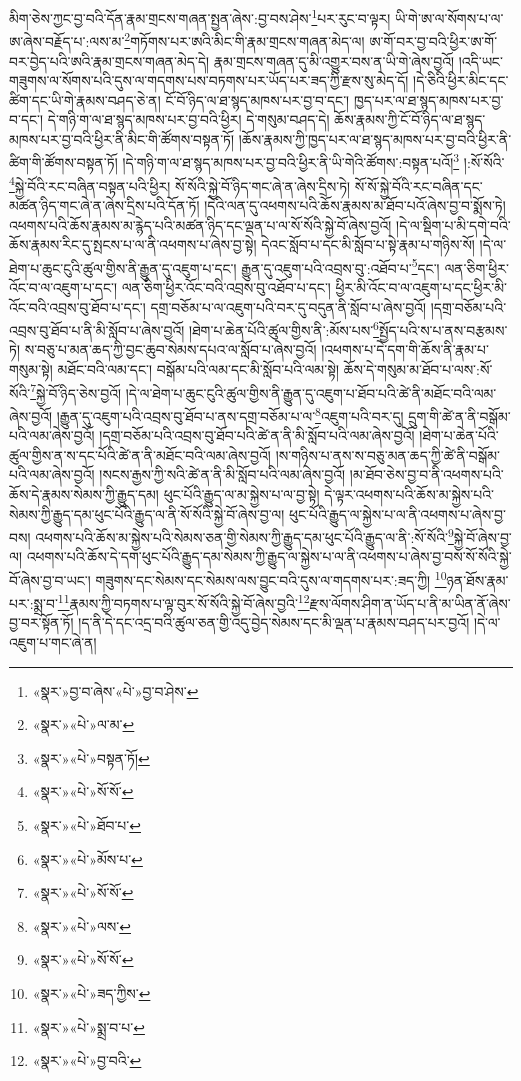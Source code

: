 མིག་ཅེས་ཀྱང་བྱ་བའི་དོན་རྣམ་གྲངས་གཞན་སྤྱན་ཞེས་:བྱ་བས་ཤེས་\footnote{«སྣར་»བྱ་བ་ཞེས་«པེ་»བྱ་བ་ཤེས་}པར་རུང་བ་ལྟར། ཡི་གེ་ཨ་ལ་སོགས་པ་ལ་ཨ་ཞེས་བརྗོད་པ་:ལས་མ་\footnote{«སྣར་»«པེ་»ལ་མ་}གཏོགས་པར་ཨའི་མིང་གི་རྣམ་གྲངས་གཞན་མེད་ལ། ཨ་གོ་བར་བྱ་བའི་ཕྱིར་ཨ་གོ་བར་བྱེད་པའི་ཨའི་རྣམ་གྲངས་གཞན་མེད་དེ། རྣམ་གྲངས་གཞན་དུ་མི་འགྱུར་བས་ན་ཡི་གེ་ཞེས་བྱའོ། །འདི་ཡང་གཟུགས་ལ་སོགས་པའི་དུས་ལ་གདགས་པས་བཏགས་པར་ཡོད་པར་ཟད་ཀྱི་རྫས་སུ་མེད་དོ། །དེ་ཅིའི་ཕྱིར་མིང་དང་ཚིག་དང་ཡི་གེ་རྣམས་བཤད་ཅེ་ན། ངོ་བོ་ཉིད་ལ་ཐ་སྙད་མཁས་པར་བྱ་བ་དང་། ཁྱད་པར་ལ་ཐ་སྙད་མཁས་པར་བྱ་བ་དང་། དེ་གཉི་ག་ལ་ཐ་སྙད་མཁས་པར་བྱ་བའི་ཕྱིར། དེ་གསུམ་བཤད་དེ། ཆོས་རྣམས་ཀྱི་ངོ་བོ་ཉིད་ལ་ཐ་སྙད་མཁས་པར་བྱ་བའི་ཕྱིར་ནི་མིང་གི་ཚོགས་བསྟན་ཏོ། །ཆོས་རྣམས་ཀྱི་ཁྱད་པར་ལ་ཐ་སྙད་མཁས་པར་བྱ་བའི་ཕྱིར་ནི་ཚིག་གི་ཚོགས་བསྟན་ཏོ། །དེ་གཉི་ག་ལ་ཐ་སྙད་མཁས་པར་བྱ་བའི་ཕྱིར་ནི་ཡི་གེའི་ཚོགས་:བསྟན་པའོ།\footnote{«སྣར་»«པེ་»བསྟན་ཏོ།} །:སོ་སོའི་\footnote{«སྣར་»«པེ་»སོ་སོ་}སྐྱེ་བོའི་རང་བཞིན་བསྟན་པའི་ཕྱིར། སོ་སོའི་སྐྱེ་བོ་ཉིད་གང་ཞེ་ན་ཞེས་དྲིས་ཏེ། སོ་སོ་སྐྱེ་བོའི་རང་བཞིན་དང་མཚན་ཉིད་གང་ཞེ་ན་ཞེས་དྲིས་པའི་དོན་ཏོ། །དེའི་ལན་དུ་འཕགས་པའི་ཆོས་རྣམས་མ་ཐོབ་པའོ་ཞེས་བྱ་བ་སྨོས་ཏེ། འཕགས་པའི་ཆོས་རྣམས་མ་རྙེད་པའི་མཚན་ཉིད་དང་ལྡན་པ་ལ་སོ་སོའི་སྐྱེ་བོ་ཞེས་བྱའོ། །དེ་ལ་སྡིག་པ་མི་དགེ་བའི་ཆོས་རྣམས་རིང་དུ་སྤངས་པ་ལ་ནི་འཕགས་པ་ཞེས་བྱ་སྟེ། དེའང་སློབ་པ་དང་མི་སློབ་པ་སྟེ་རྣམ་པ་གཉིས་སོ། །དེ་ལ་ཐེག་པ་ཆུང་ངུའི་ཚུལ་གྱིས་ནི་རྒྱུན་དུ་འཇུག་པ་དང་། རྒྱུན་དུ་འཇུག་པའི་འབྲས་བུ་:འཐོབ་པ་\footnote{«སྣར་»«པེ་»ཐོབ་པ་}དང་། ལན་ཅིག་ཕྱིར་འོང་བ་ལ་འཇུག་པ་དང་། ལན་ཅིག་ཕྱིར་འོང་བའི་འབྲས་བུ་འཐོབ་པ་དང་། ཕྱིར་མི་འོང་བ་ལ་འཇུག་པ་དང་ཕྱིར་མི་འོང་བའི་འབྲས་བུ་ཐོབ་པ་དང་། དགྲ་བཅོམ་པ་ལ་འཇུག་པའི་བར་དུ་བདུན་ནི་སློབ་པ་ཞེས་བྱའོ། །དགྲ་བཅོམ་པའི་འབྲས་བུ་ཐོབ་པ་ནི་མི་སློབ་པ་ཞེས་བྱའོ། །ཐེག་པ་ཆེན་པོའི་ཚུལ་གྱིས་ནི་:མོས་པས་\footnote{«སྣར་»«པེ་»མོས་པ་}སྤྱོད་པའི་ས་པ་ནས་བརྩམས་ཏེ། ས་བཅུ་པ་མན་ཆད་ཀྱི་བྱང་ཆུབ་སེམས་དཔའ་ལ་སློབ་པ་ཞེས་བྱའོ། །འཕགས་པ་དེ་དག་གི་ཆོས་ནི་རྣམ་པ་གསུམ་སྟེ། མཐོང་བའི་ལམ་དང་། བསྒོམ་པའི་ལམ་དང་མི་སློབ་པའི་ལམ་སྟེ། ཆོས་དེ་གསུམ་མ་ཐོབ་པ་ལས་:སོ་སོའི་\footnote{«སྣར་»«པེ་»སོ་སོ་}སྐྱེ་བོ་ཉིད་ཅེས་བྱའོ། །དེ་ལ་ཐེག་པ་ཆུང་ངུའི་ཚུལ་གྱིས་ནི་རྒྱུན་དུ་འཇུག་པ་ཐོབ་པའི་ཚེ་ནི་མཐོང་བའི་ལམ་ཞེས་བྱའོ། །རྒྱུན་དུ་འཇུག་པའི་འབྲས་བུ་ཐོབ་པ་ནས་དགྲ་བཅོམ་པ་ལ་\footnote{«སྣར་»«པེ་»ལས་}འཇུག་པའི་བར་དུ། དྲུག་གི་ཚེ་ན་ནི་བསྒོམ་པའི་ལམ་ཞེས་བྱའོ། །དགྲ་བཅོམ་པའི་འབྲས་བུ་ཐོབ་པའི་ཚེ་ན་ནི་མི་སློབ་པའི་ལམ་ཞེས་བྱའོ། །ཐེག་པ་ཆེན་པོའི་ཚུལ་གྱིས་ན་ས་དང་པོའི་ཚེ་ན་ནི་མཐོང་བའི་ལམ་ཞེས་བྱའོ། །ས་གཉིས་པ་ནས་ས་བཅུ་མན་ཆད་ཀྱི་ཚེ་ནི་བསྒོམ་པའི་ལམ་ཞེས་བྱའོ། །སངས་རྒྱས་ཀྱི་སའི་ཚེ་ན་ནི་མི་སློབ་པའི་ལམ་ཞེས་བྱའོ། །མ་ཐོབ་ཅེས་བྱ་བ་ནི་འཕགས་པའི་ཆོས་དེ་རྣམས་སེམས་ཀྱི་རྒྱུད་དམ། ཕུང་པོའི་རྒྱུད་ལ་མ་སྐྱེས་པ་ལ་བྱ་སྟེ། དེ་ལྟར་འཕགས་པའི་ཆོས་མ་སྐྱེས་པའི་སེམས་ཀྱི་རྒྱུད་དམ་ཕུང་པོའི་རྒྱུད་ལ་ནི་སོ་སོའི་སྐྱེ་བོ་ཞེས་བྱ་ལ། ཕུང་པོའི་རྒྱུད་ལ་སྐྱེས་པ་ལ་ནི་འཕགས་པ་ཞེས་བྱ་བས། འཕགས་པའི་ཆོས་མ་སྐྱེས་པའི་སེམས་ཅན་གྱི་སེམས་ཀྱི་རྒྱུད་དམ་ཕུང་པོའི་རྒྱུད་ལ་ནི་:སོ་སོའི་\footnote{«སྣར་»«པེ་»སོ་སོ་}སྐྱེ་བོ་ཞེས་བྱ་ལ། འཕགས་པའི་ཆོས་དེ་དག་ཕུང་པོའི་རྒྱུད་དམ་སེམས་ཀྱི་རྒྱུད་ལ་སྐྱེས་པ་ལ་ནི་འཕགས་པ་ཞེས་བྱ་བས་སོ་སོའི་སྐྱེ་བོ་ཞེས་བྱ་བ་ཡང་། གཟུགས་དང་སེམས་དང་སེམས་ལས་བྱུང་བའི་དུས་ལ་གདགས་པར་:ཟད་ཀྱི། \footnote{«སྣར་»«པེ་»ཟད་ཀྱིས་}ཉན་ཐོས་རྣམ་པར་:སྨྲ་བ་\footnote{«སྣར་»«པེ་»སྨྲ་བ་པ་}རྣམས་ཀྱི་བཏགས་པ་ལྟ་བུར་སོ་སོའི་སྐྱེ་བོ་ཞེས་བྱའི་\footnote{«སྣར་»«པེ་»བྱ་བའི་}རྫས་ལོགས་ཤིག་ན་ཡོད་པ་ནི་མ་ཡིན་ནོ་ཞེས་བྱ་བར་སྟོན་ཏོ། །ད་ནི་དེ་དང་འདྲ་བའི་ཚུལ་ཅན་གྱི་འདུ་བྱེད་སེམས་དང་མི་ལྡན་པ་རྣམས་བཤད་པར་བྱའོ། །དེ་ལ་འཇུག་པ་གང་ཞེ་ན། 